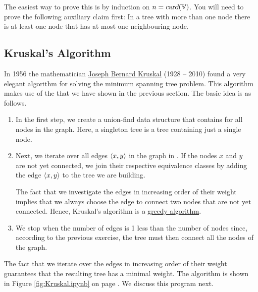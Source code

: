 \hint
The easiest way to prove this is by induction on $n = \textsl{card}(\mathbb{V})$.  You will need to prove the
following auxiliary claim first: In a tree with more than one node there is at least one node that has
at most one neighbouring node. 
\eox

\subsection{Kruskal's Algorithm}
In 1956 the mathematician \href{https://en.wikipedia.org/wiki/Joseph_Kruskal}{Joseph Bernard Kruskal} (1928 -- 2010) 
found a very elegant algorithm for solving the minimum spanning tree problem.   This algorithm makes use
of the  that we have shown in the previous section.  The basic idea is as
follows.
\begin{enumerate}
\item In the first step, we create a union-find data structure that contains 
      for all nodes in the graph.  Here, a singleton tree is a tree containing just a single node.
\item Next, we iterate over all edges $\pair(x, y)$ in the graph in .
      If the nodes $x$ and $y$ are not yet connected, we join their respective equivalence classes by adding
      the edge $\pair(x, y)$ to the tree we are building.

      The fact that we investigate the edges in increasing order of their weight implies that we always choose
      the  edge to connect two nodes that are not yet connected.  Hence, Kruskal's algorithm is a
      \href{https://en.wikipedia.org/wiki/Greedy_algorithm}{greedy algorithm}.
\item We stop when the number of edges is 1 less than the number of nodes since, according to the
      previous exercise, the tree must then connect all the nodes of the graph. 
\end{enumerate}
The fact that we iterate over the edges in increasing order of their weight guarantees that the
resulting tree has a minimal weight.
The algorithm is shown in Figure \ref{fig:Kruskal.ipynb} on page \pageref{fig:Kruskal.ipynb}.  We
discuss this program next. 

